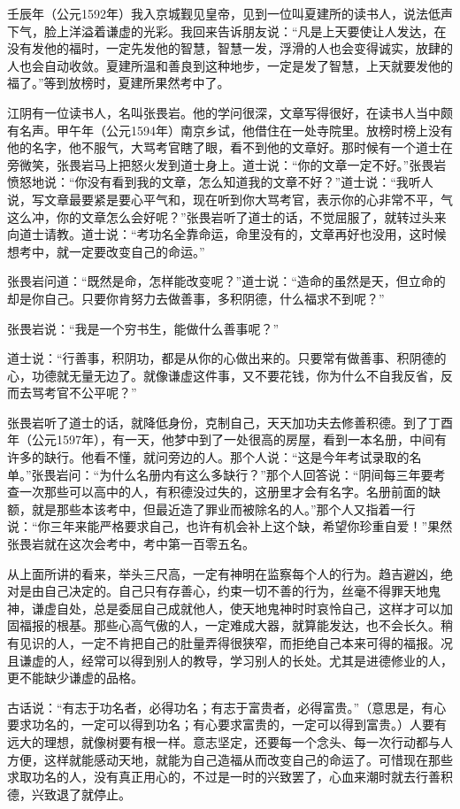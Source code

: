 \documentclass[12pt,UTF8]{ctexbook}
\begin{document}
壬辰年（公元1592年）我入京城觐见皇帝，见到一位叫夏建所的读书人，说法低声下气，脸上洋溢着谦虚的光彩。我回来告诉朋友说：“凡是上天要使让人发达，在没有发他的福时，一定先发他的智慧，智慧一发，浮滑的人也会变得诚实，放肆的人也会自动收敛。夏建所温和善良到这种地步，一定是发了智慧，上天就要发他的福了。”等到放榜时，夏建所果然考中了。

江阴有一位读书人，名叫张畏岩。他的学问很深，文章写得很好，在读书人当中颇有名声。甲午年（公元1594年）南京乡试，他借住在一处寺院里。放榜时榜上没有他的名字，他不服气，大骂考官瞎了眼，看不到他的文章好。那时候有一个道士在旁微笑，张畏岩马上把怒火发到道士身上。道士说：“你的文章一定不好。”张畏岩愤怒地说：“你没有看到我的文章，怎么知道我的文章不好？”道士说：“我听人说，写文章最要紧是要心平气和，现在听到你大骂考官，表示你的心非常不平，气这么冲，你的文章怎么会好呢？”张畏岩听了道士的话，不觉屈服了，就转过头来向道士请教。道士说：“考功名全靠命运，命里没有的，文章再好也没用，这时候想考中，就一定要改变自己的命运。”

张畏岩问道：“既然是命，怎样能改变呢？”道士说：“造命的虽然是天，但立命的却是你自己。只要你肯努力去做善事，多积阴德，什么福求不到呢？”

张畏岩说：“我是一个穷书生，能做什么善事呢？”

道士说：“行善事，积阴功，都是从你的心做出来的。只要常有做善事、积阴德的心，功德就无量无边了。就像谦虚这件事，又不要花钱，你为什么不自我反省，反而去骂考官不公平呢？”

张畏岩听了道士的话，就降低身份，克制自己，天天加功夫去修善积德。到了丁酉年（公元1597年），有一天，他梦中到了一处很高的房屋，看到一本名册，中间有许多的缺行。他看不懂，就问旁边的人。那个人说：“这是今年考试录取的名单。”张畏岩问：“为什么名册内有这么多缺行？”那个人回答说：“阴间每三年要考查一次那些可以高中的人，有积德没过失的，这册里才会有名字。名册前面的缺额，就是那些本该考中，但最近造了罪业而被除名的人。”那个人又指着一行说：“你三年来能严格要求自己，也许有机会补上这个缺，希望你珍重自爱！”果然张畏岩就在这次会考中，考中第一百零五名。

从上面所讲的看来，举头三尺高，一定有神明在监察每个人的行为。趋吉避凶，绝对是由自己决定的。自己只有存善心，约束一切不善的行为，丝毫不得罪天地鬼神，谦虚自处，总是委屈自己成就他人，使天地鬼神时时哀怜自己，这样才可以加固福报的根基。那些心高气傲的人，一定难成大器，就算能发达，也不会长久。稍有见识的人，一定不肯把自己的肚量弄得很狭窄，而拒绝自己本来可得的福报。况且谦虚的人，经常可以得到别人的教导，学习别人的长处。尤其是进德修业的人，更不能缺少谦虚的品格。

古话说：“有志于功名者，必得功名；有志于富贵者，必得富贵。”（意思是，有心要求功名的，一定可以得到功名；有心要求富贵的，一定可以得到富贵。）人要有远大的理想，就像树要有根一样。意志坚定，还要每一个念头、每一次行动都与人方便，这样就能感动天地，就能为自己造福从而改变自己的命运了。可惜现在那些求取功名的人，没有真正用心的，不过是一时的兴致罢了，心血来潮时就去行善积德，兴致退了就停止。
\backmatter
\end{document}
